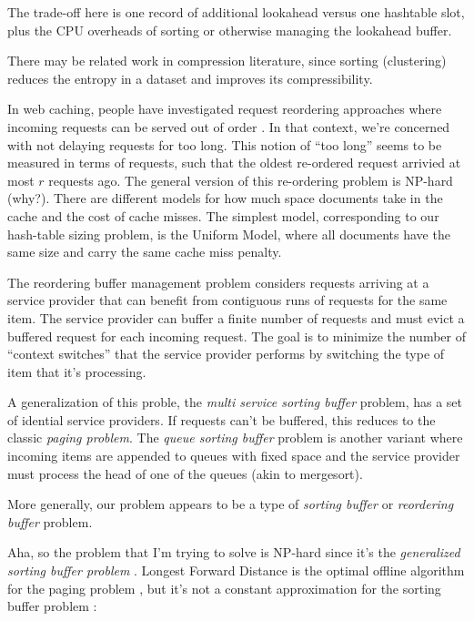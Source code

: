 \documentclass[12pt]{article}
\begin{document}
The trade-off here is one record of additional lookahead versus one hashtable slot, plus the CPU overheads of sorting or otherwise managing the lookahead buffer.

There may be related work in compression literature, since sorting (clustering) reduces the entropy in a dataset and improves its compressibility.

In web caching, people have investigated request reordering approaches where incoming requests can be served out of order \cite{web-caching-new-results}.  In that context, we're concerned with not delaying requests for too long.  This notion of ``too long'' seems to be measured in terms of requests, such that the oldest re-ordered request arrivied at most $r$ requests ago.  The general version of this re-ordering problem is NP-hard (why?).  There are different models for how much space documents take in the cache and the cost of cache misses.  The simplest model, corresponding to our hash-table sizing problem, is the Uniform Model, where all documents have the same size and carry the same cache miss penalty.

The reordering buffer management problem \cite{online-scheduling-for-sorting-buffers} considers requests arriving at a service provider that can benefit from contiguous runs of requests for the same item.  The service provider can buffer a finite number of requests and must evict a buffered request for each incoming request.  The goal is to minimize the number of ``context switches'' that the service provider performs by switching the type of item that it's processing.

A generalization of this proble, the \emph{multi service sorting buffer} problem, has a set of idential service providers.  If requests can't be buffered, this reduces to the classic \emph{paging problem}.  The \emph{queue sorting buffer} problem is another variant where incoming items are appended to queues with fixed space and the service provider must process the head of one of the queues (akin to mergesort).

More generally, our problem appears to be a type of \emph{sorting buffer} or \emph{reordering buffer} problem.

Aha, so the problem that I'm trying to solve is NP-hard since it's the \emph{generalized sorting buffer problem} \cite{sorting-buffer-np-hardness}.
Longest Forward Distance is the optimal offline algorithm for the paging problem \cite{lfd}, but it's not a constant approximation for the sorting buffer problem \cite{sorting-buffer-np-hardness}:
\end{document}
